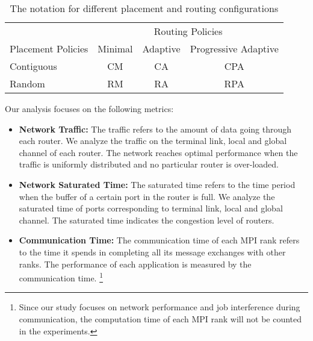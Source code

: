
\begin{table}[ht]
\begin{center}
\caption{The notation for different placement and routing configurations} 
\label{tab: placement routing configs}
\begin{tabular}{l c c c }
\toprule %
\toprule
&\multicolumn{3}{c}{Routing Policies} \\ 
\cmidrule(l){2-4}
Placement Policies & Minimal & Adaptive & Progressive Adaptive\\ %
\midrule %
Contiguous  &  CM   &   CA   &  CPA   \\ %
\midrule
Random  &   RM  &   RA   &  RPA   \\ 
\midrule %
\bottomrule %
\end{tabular}
\end{center}
\end{table}


Our analysis focuses on the following metrics:
\begin{itemize}

    \item \textbf{Network Traffic:} The traffic refers to the amount of data going through each router. We analyze the traffic on the terminal link, local and global channel of each router. The network reaches optimal performance when the traffic is uniformly distributed and no particular router is over-loaded. 
            
    \item \textbf{Network Saturated Time:} The saturated time refers to the time period when the buffer of a certain port in the router is full. We analyze the saturated time of ports corresponding to terminal link, local and global channel. The saturated time indicates the congestion level of routers. 
    
    \item \textbf{Communication Time:} The communication time of each MPI rank refers to the time it spends in completing all its message exchanges with other ranks. The performance of each application is measured by the communication time.  
\footnote{Since our study focuses on network performance and job interference during communication, the computation time of each MPI rank will not be counted in the experiments.
}

\end{itemize}



